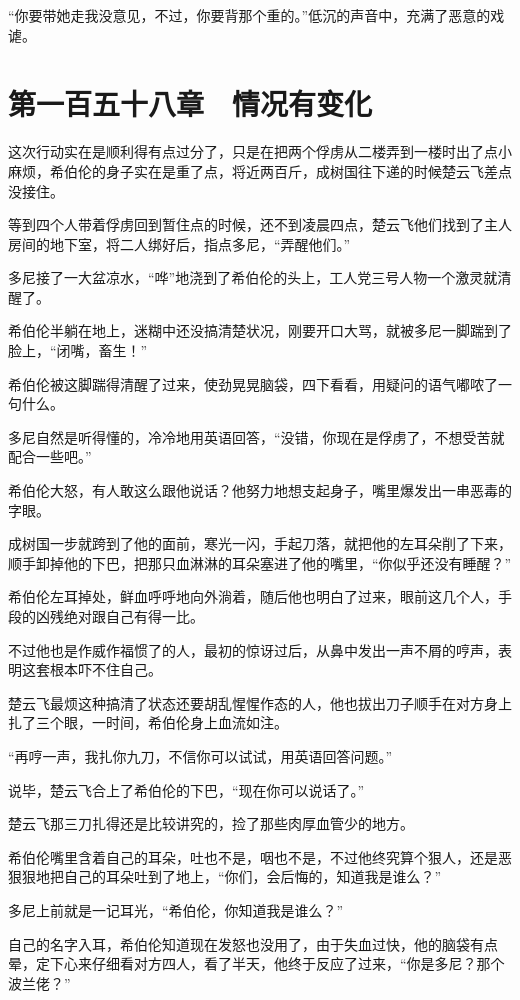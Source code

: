 “你要带她走我没意见，不过，你要背那个重的。”低沉的声音中，充满了恶意的戏谑。

\section{第一百五十八章　情况有变化}

这次行动实在是顺利得有点过分了，只是在把两个俘虏从二楼弄到一楼时出了点小麻烦，希伯伦的身子实在是重了点，将近两百斤，成树国往下递的时候楚云飞差点没接住。

等到四个人带着俘虏回到暂住点的时候，还不到凌晨四点，楚云飞他们找到了主人房间的地下室，将二人绑好后，指点多尼，“弄醒他们。”

多尼接了一大盆凉水，“哗”地浇到了希伯伦的头上，工人党三号人物一个激灵就清醒了。

希伯伦半躺在地上，迷糊中还没搞清楚状况，刚要开口大骂，就被多尼一脚踹到了脸上，“闭嘴，畜生！”

希伯伦被这脚踹得清醒了过来，使劲晃晃脑袋，四下看看，用疑问的语气嘟哝了一句什么。

多尼自然是听得懂的，冷冷地用英语回答，“没错，你现在是俘虏了，不想受苦就配合一些吧。”

希伯伦大怒，有人敢这么跟他说话？他努力地想支起身子，嘴里爆发出一串恶毒的字眼。

成树国一步就跨到了他的面前，寒光一闪，手起刀落，就把他的左耳朵削了下来，顺手卸掉他的下巴，把那只血淋淋的耳朵塞进了他的嘴里，“你似乎还没有睡醒？”

希伯伦左耳掉处，鲜血呼呼地向外淌着，随后他也明白了过来，眼前这几个人，手段的凶残绝对跟自己有得一比。

不过他也是作威作福惯了的人，最初的惊讶过后，从鼻中发出一声不屑的哼声，表明这套根本吓不住自己。

楚云飞最烦这种搞清了状态还要胡乱惺惺作态的人，他也拔出刀子顺手在对方身上扎了三个眼，一时间，希伯伦身上血流如注。

“再哼一声，我扎你九刀，不信你可以试试，用英语回答问题。”

说毕，楚云飞合上了希伯伦的下巴，“现在你可以说话了。”

楚云飞那三刀扎得还是比较讲究的，捡了那些肉厚血管少的地方。

希伯伦嘴里含着自己的耳朵，吐也不是，咽也不是，不过他终究算个狠人，还是恶狠狠地把自己的耳朵吐到了地上，“你们，会后悔的，知道我是谁么？”

多尼上前就是一记耳光，“希伯伦，你知道我是谁么？”

自己的名字入耳，希伯伦知道现在发怒也没用了，由于失血过快，他的脑袋有点晕，定下心来仔细看对方四人，看了半天，他终于反应了过来，“你是多尼？那个波兰佬？”

